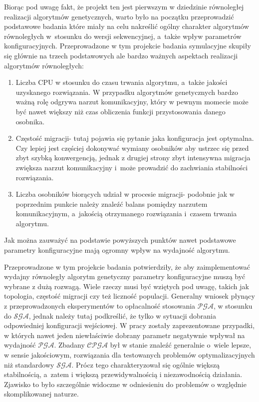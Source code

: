 Biorąc pod uwagę fakt, że projekt ten jest pierwszym w dziedzinie równoległej
realizacji algorytmów genetycznych, warto było na początku przeprowadzić
podstawowe badania które miały na celu nakreślić ogólny charakter algorytmów
równoległych w~stosunku do wersji sekwencyjnej, a~także wpływ parametrów
konfiguracyjnych. Przeprowadzone w tym projekcie badania symulacyjne skupiły się
głównie na trzech podstawowych ale bardzo ważnych aspektach realizacji algorytmów równoległych:
\begin{enumerate}
	\item Liczba CPU w stosunku do czasu trwania algorytmu, a~także jakości
		uzyskanego rozwiązania. W przypadku algorytmów genetycznych bardzo
		ważną rolę odgrywa narzut komunikacyjny, który w pewnym momecie może być
		nawet większy niż czas obliczenia funkcji przystosowania danego
		osobnika. 
	\item Częstość migracji- tutaj pojawia się pytanie jaka konfiguracja jest
		optymalna. Czy lepiej jest częściej dokonywać wymiany osobników aby ustrzec
		się przed zbyt szybką konwergencją, jednak z drugiej strony zbyt
		intensywna migracja zwiększa narzut komunikacyjny i~może prowadzić do
		zachwiania stabilności rozwiązania. 
	\item Liczba osobników biorących udział w procesie migracji- podobnie jak w
		poprzednim punkcie należy znaleźć balans pomiędzy narzutem
		komunikacyjnym, a~jakością otrzymanego rozwiązania i~czasem trwania
		algorytmu.
\end{enumerate}
Jak można zauważyć na podstawie powyższych punktów nawet podstawowe parametry
konfiguracyjne mają ogromny wpływ na wydajność algorytmu.

Przeprowadzone w tym projekcie badania potwierdziły, że aby zaimplementować wydajny równoległy
algorytm genetyczny parametry konfiguracyjne muszą być wybrane z dużą rozwagą.
Wiele rzeczy musi być wziętych pod uwagę, takich jak topologia, częstość
migracji czy też liczność populacji. Generalny wniosek płynący z przeprowadzonych 
eksperymentów to opłacalność stosowania $\mathcal{PGA}$, w stosunku do
$\mathcal{SGA}$, jednak należy tutaj podkreślić, że tylko w sytuacji dobrania
odpowiedniej konfiguracji wejściowej. W pracy zostały zaprezentowane przypadki,
w których nawet jeden niewłaściwie dobrany parametr negatywnie wpływał na
wydajność $\mathcal{PGA}$. Zbadany $\mathcal{CPGA}$ był w stanie znaleźć
generalnie o~wiele lepsze, w sensie
jakościowym, rozwiązania dla testowanych problemów optymalizacyjnych niż standardowy
$\mathcal{SGA}$. Prócz tego charakteryzował się ogólnie większą stabilnością, 
a~zatem i większą przewidywalnością i niezawodnością działania. Zjawisko to było
szczególnie widoczne w odniesieniu do problemów o względnie skomplikowanej naturze.

